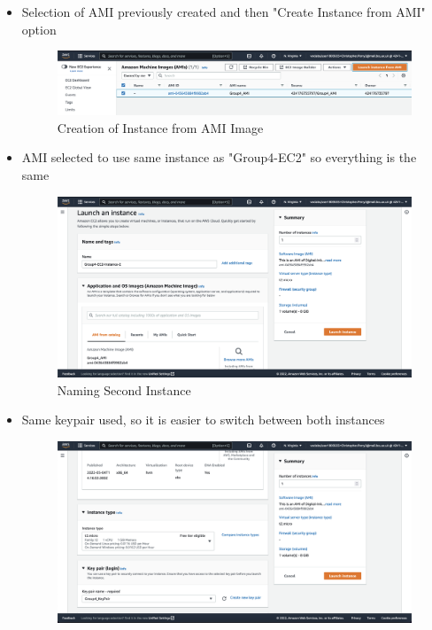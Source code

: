 \begin{itemize}
	\item Selection of AMI previously created and then "Create Instance from AMI" option \begin{figure}[H]
	      \centering
	      \includegraphics[width=\textwidth]{resources/elb/elb-instance-from-ami.png}
	      \caption{Creation of Instance from AMI Image}
	      \label{fig:elb-instance-from-ami}
	\end{figure}
	\item AMI selected to use same instance as "Group4-EC2" so everything is the same \begin{figure}[H]
	      \centering
	      \includegraphics[width=\textwidth]{resources/elb/elb-instance-2-name.png}
	      \caption{Naming Second Instance}
	      \label{fig:elb-instance-2-name}
	\end{figure}
	\item Same keypair used, so it is easier to switch between both instances \begin{figure}[H]
	      \centering
	      \includegraphics[width=\textwidth]{resources/elb/elb-instance-2-type-and-keypair.png}

\end{figure}
\end{itemize}

